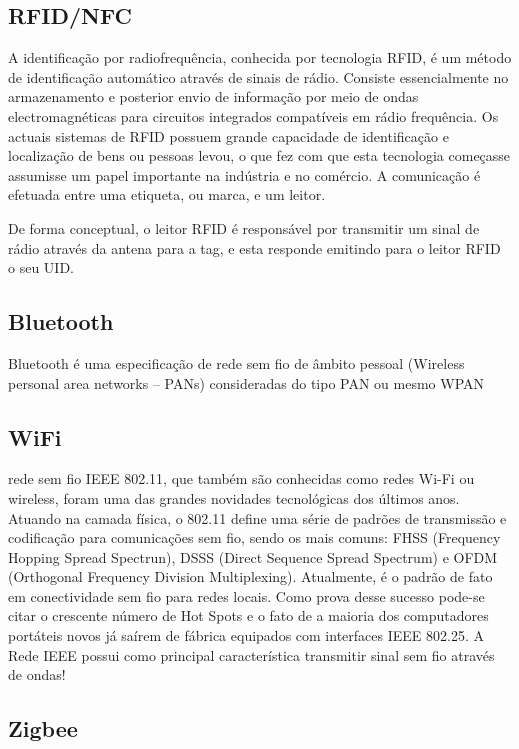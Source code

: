 \subsection{RFID/NFC}

A identificação por radiofrequência, conhecida por tecnologia \ac{RFID}, é um método de identificação automático através de sinais de rádio. Consiste essencialmente no armazenamento e posterior envio de informação por meio de ondas electromagnéticas para circuitos integrados compatíveis em rádio frequência.  
Os actuais sistemas de \ac{RFID} possuem grande capacidade de identificação e localização de bens ou pessoas levou, o que fez com que esta tecnologia começasse assumisse um papel importante na indústria e no comércio. A comunicação é efetuada entre uma etiqueta, ou marca, e um leitor.


De forma conceptual, o leitor \ac{RFID} é responsável por transmitir um sinal de rádio através da antena para a tag, e esta responde emitindo para o leitor \ac{RFID} o seu \ac{UID}.


\subsection{Bluetooth}

Bluetooth é uma especificação de rede sem fio de âmbito pessoal (Wireless personal area networks – PANs) consideradas do tipo PAN ou mesmo WPAN


\subsection{WiFi}

rede sem fio IEEE 802.11, que também são conhecidas como redes Wi-Fi ou wireless, foram uma das grandes novidades tecnológicas dos últimos anos. Atuando na camada física, o 802.11 define uma série de padrões de transmissão e codificação para comunicações sem fio, sendo os mais comuns: FHSS (Frequency Hopping Spread Spectrun), DSSS (Direct Sequence Spread Spectrum) e OFDM (Orthogonal Frequency Division Multiplexing). Atualmente, é o padrão de fato em conectividade sem fio para redes locais. Como prova desse sucesso pode-se citar o crescente número de Hot Spots e o fato de a maioria dos computadores portáteis novos já saírem de fábrica equipados com interfaces IEEE 802.25. A Rede IEEE possui como principal característica transmitir sinal sem fio através de ondas!


\subsection{Zigbee}

